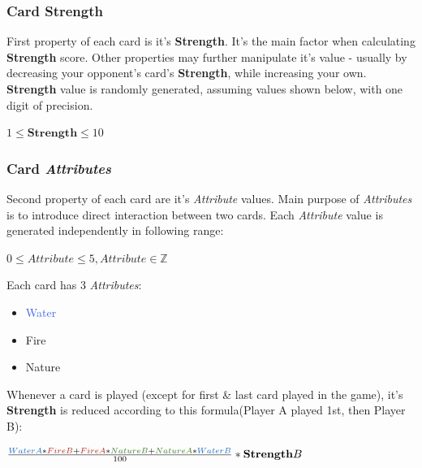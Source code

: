 \documentclass{article}
\begin{document}
\subsubsection{Card \textbf{Strength}}

    First property of each card is it's \textbf{Strength}. It's the main factor when calculating \textbf{Strength} score. Other properties may further manipulate it's value - usually by decreasing your opponent's card's \textbf{Strength}, while increasing your own. \textbf{Strength} value is randomly generated, assuming values shown below, with one digit of precision.

\begin{center}
   $1 \leq \textbf{Strength} \leq 10$   
\end{center}
  
\subsubsection{Card \textit{Attributes}}

    Second property of each card are it's \textit{Attribute} values. Main purpose of \textit{Attributes} is to introduce direct interaction between two cards. Each \textit{Attribute} value is generated independently in following range: 
    
    \begin{center}
    $0 \leq \textit{Attribute} \leq 5, \textit{Attribute} \in \mathbb{Z}$
    \end{center}
    
    \begin{flushleft}
        Each card has 3 \textit{Attributes}: 
    \end{flushleft}
    
    \begin{itemize}
        \item \textcolor{RoyalBlue}{Water}
        \item \textcolor{BrickRed}{Fire}
        \item \textcolor{OliveGreen}{Nature}
    \end{itemize}
    
    \begin{flushleft}
        Whenever a card is played (except for first \& last card played in the game), it's \textbf{Strength} is reduced according to this formula(Player A played 1st, then Player B):
    \end{flushleft}
    
    \begin{center}
        $\frac{\textcolor{RoyalBlue}{Water A} * \textcolor{BrickRed}{Fire B} + \textcolor{BrickRed}{Fire A} * \textcolor{OliveGreen}{Nature B} + 
        \textcolor{OliveGreen}{Nature A} * \textcolor{RoyalBlue}{Water B}}{100}*\textbf{Strength} B$
    \end{center}
    
\end{document}
